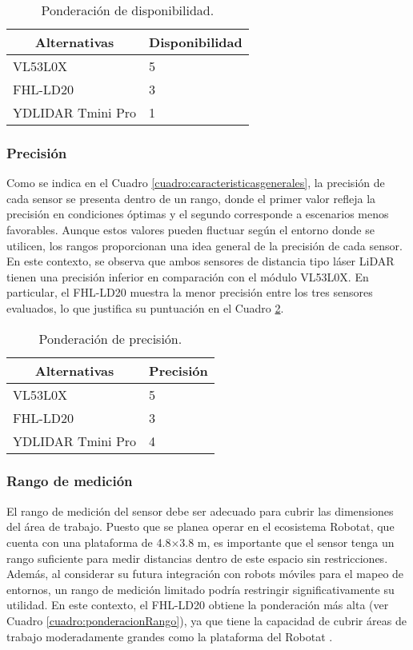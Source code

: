 \begin{table}[H]
	\centering
	\begin{tabular}{|l|l|}
		\hline
		\multicolumn{1}{|c|}{\textbf{Alternativas}}&\multicolumn{1}{|c|}{\textbf{Disponibilidad}}\\ \hline
		VL53L0X&5\\ \hline
		FHL-LD20&3\\ \hline
		YDLIDAR Tmini Pro&1\\ \hline
	\end{tabular}
	\caption{Ponderación de disponibilidad.} 
	\label{cuadro:ponderacionDisponibilidad}
\end{table}

\subsubsection{Precisión}
Como se indica en el Cuadro \ref{cuadro:caracteristicasgenerales}, la precisión de cada sensor se presenta dentro de un rango, donde el primer valor refleja la precisión en condiciones óptimas y el segundo corresponde a escenarios menos favorables. Aunque estos valores pueden fluctuar según el entorno donde se utilicen, los rangos proporcionan una idea general de la precisión de cada sensor. En este contexto, se observa que ambos sensores de distancia tipo láser LiDAR tienen una precisión inferior en comparación con el módulo VL53L0X. En particular, el FHL-LD20 muestra la menor precisión entre los tres sensores evaluados, lo que justifica su puntuación en el Cuadro \ref{cuadro:ponderacionPrecision}. 

\begin{table}[H]
	\centering
	\begin{tabular}{|l|l|}
		\hline
		\multicolumn{1}{|c|}{\textbf{Alternativas}}&\multicolumn{1}{|c|}{\textbf{Precisión}}\\ \hline
		VL53L0X&5\\ \hline
		FHL-LD20&3\\ \hline
		YDLIDAR Tmini Pro&4\\ \hline
	\end{tabular}
	\caption{Ponderación de precisión.} 
	\label{cuadro:ponderacionPrecision}
\end{table}

\subsubsection{Rango de medición}
El rango de medición del sensor debe ser adecuado para cubrir las dimensiones del área de trabajo. Puesto que se planea operar en el ecosistema Robotat, que cuenta con una plataforma de 4.8$\times$3.8 m, es importante que el sensor tenga un rango suficiente para medir distancias dentro de este espacio sin restricciones. Además, al considerar su futura integración con robots móviles para el mapeo de entornos, un rango de medición limitado podría restringir significativamente su utilidad. En este contexto, el FHL-LD20 obtiene la ponderación más alta (ver Cuadro \ref{cuadro:ponderacionRango}), ya que tiene la capacidad de cubrir áreas de trabajo moderadamente grandes como la plataforma del Robotat . 

